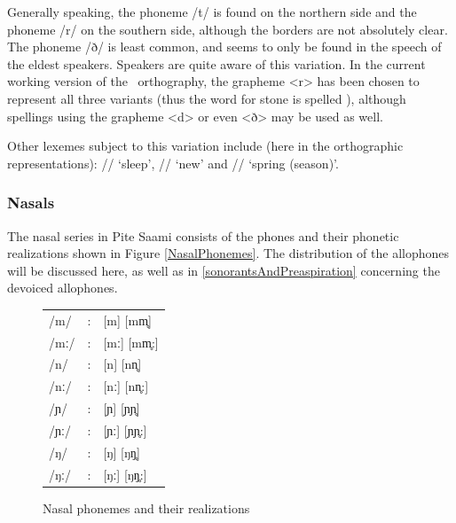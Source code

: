 Generally speaking, the phoneme /t/ is found on the northern side and the phoneme /r/ on the southern side, although the borders are not absolutely clear. The phoneme /ð/ is least common, and seems to only be found in the speech of the eldest speakers.   
Speakers are quite aware of this variation. 
In the current working version of the \PS\ orthography, the grapheme <r> has been chosen to represent all three variants (thus the word for stone is spelled ), although spellings using the grapheme <d> or even <ð> may be used as well. 

Other lexemes subject to this variation include (here in the orthographic representations): 
// ‘sleep’, 
// ‘new’ and 
//  ‘spring (season)’. 



\FB

\subsubsection{Nasals}\label{Nasals}%
The nasal series in Pite Saami consists of the phones and their phonetic realizations shown in Figure \vref{NasalPhonemes}. The distribution of the allophones will be discussed here, as well as in \SEC\ref{sonorantsAndPreaspiration} concerning the devoiced allophones. 
\begin{figure}\centering
\begin{tabular}{l c l}
/m/ &:& [m] [mm̥] \\ %
/mː/ &:& [mː] [mm̥:] \\ %
/n/ &:& [n] [nn̥] \\ %
/nː/ &:& [nː] [nn̥:]\\ %
/ɲ/ &:& [ɲ] [ɲɲ̥]\\ %
/ɲː/ &:& [ɲː] [ɲɲ̥:]\\ %
/ŋ/ &:& [ŋ] [ŋŋ̥]\\ %
/ŋː/ &:& [ŋː] [ŋŋ̥:]\\ %
\end{tabular}
\caption{Nasal phonemes and their realizations}\label{NasalPhonemes}
\end{figure}



